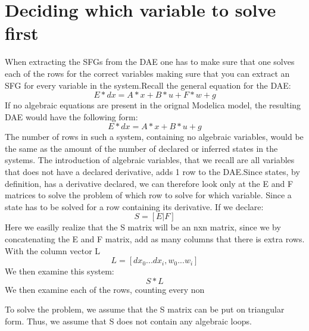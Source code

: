 
\section{Deciding which variable to solve first}
When extracting the SFGs from the DAE one has to make sure that one solves each of the rows for the correct variables making sure that you can extract an SFG for every variable in the system.Recall the general equation for the DAE:
\begin{equation}
E*dx = A*x + B*u + F*w + g
\end{equation}
If no algebraic equations are present in the orignal Modelica model, the resulting DAE would have the following form:
\begin{equation}
E*dx = A*x + B*u + g
\end{equation}
The number of rows in such a system, containing no algebraic variables, would be the same as the amount of the number of declared or inferred states in the systems. The introduction of algebraic variables, that we recall are all variables that does not have a declared derivative, adds 1 row to the DAE.Since states, by definition, has a derivative declared, we can therefore look only at the E and F matrices to solve the problem of which row to solve for which variable. Since a state has to be solved for a row containing its derivative. If we declare:
\begin{equation}
S=[E|F]
\end{equation}
Here we easilly realize that the S matrix will be an nxn matrix, since we by concatenating the E and F matrix, add as many columns that there is extra rows.\\
With the column vector L
\begin{equation}
L=[dx_0...dx_i, w_0...w_i]
\end{equation}
We then examine this system:
\begin{equation}
S*L
\end{equation}
 We then examine each of the rows, counting every non

To solve the problem, we assume that the S matrix can be put on triangular form. Thus, we assume that S does not contain any algebraic loops. 